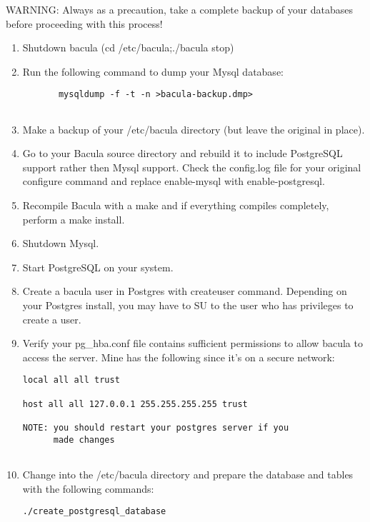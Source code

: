 {{{{WARNING: Always as a precaution, take a complete backup of your databases
before proceeding with this process! 

\begin{enumerate}
\item Shutdown bacula (cd /etc/bacula;./bacula stop)  
\item Run the following command to dump your Mysql database:  

   \footnotesize
\begin{verbatim}
       mysqldump -f -t -n >bacula-backup.dmp>
    
\end{verbatim}
\normalsize

\item Make a backup of your /etc/bacula directory (but leave the  original in
   place).  
\item Go to your Bacula source directory and rebuild it to include  PostgreSQL
   support rather then Mysql support. Check the  config.log file for your
   original configure command and replace  enable-mysql with enable-postgresql.  
\item Recompile Bacula with a make and if everything compiles  completely,
   perform a make install.  
\item Shutdown Mysql. 
\item Start PostgreSQL on your system.  
\item Create a bacula user in Postgres with createuser command.  Depending on
   your Postgres install, you may have to SU to the  user who has privileges to
   create a user.  
\item Verify your pg\_hba.conf file contains sufficient permissions to  allow
   bacula to access the server. Mine has the following since  it's on a secure
   network:  

\footnotesize
\begin{verbatim}
local all all trust
                
host all all 127.0.0.1 255.255.255.255 trust
                
NOTE: you should restart your postgres server if you
      made changes
      
\end{verbatim}
\normalsize

\item Change into the /etc/bacula directory and prepare the database  and
   tables with the following commands:  

\footnotesize
\begin{verbatim}
./create_postgresql_database
                                

\end{verbatim}
\end{enumerate}}}}}
